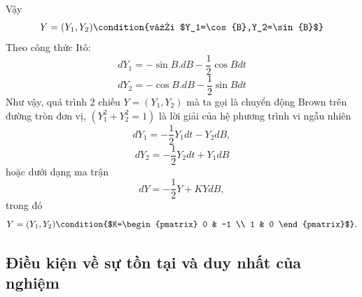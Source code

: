 \documentclass[14pt,a4paper]{article}
\numberwithin{equation}{section}
\begin{document}
Vậy
\begin{equation*}
	Y=(Y_1,Y_2) \condition{với $Y_1=\cos{B},Y_2=\sin{B}$}
\end{equation*}
Theo công thức Itô:
\begin{equation*}
	dY_1=-\sin{B.dB}-\dfrac{1}{2}\cos{B}dt
\end{equation*}
\begin{equation*}
	dY_2=-\cos{B.dB}-\dfrac{1}{2}\sin{B}dt
\end{equation*}
Như vậy, quá trình 2 chiều $Y=(Y_1,Y_2)$ mà ta gọi là chuyển động Brown trên đường tròn đơn vị, $(Y_1^2+Y_2^2=1)$ là lời giải của hệ phương trình vi ngẫu nhiên
\begin{equation*}
	dY_1=-\dfrac{1}{2}Y_1dt-Y_2dB,
\end{equation*}
\begin{equation*}
	dY_2=-\dfrac{1}{2}Y_2dt+Y_1dB
\end{equation*}
hoặc dưới dạng ma trận
\begin{equation*}
	dY=-\dfrac{1}{2}Y+KYdB,
\end{equation*} 
trong đó
\begin{equation*}
	Y=(Y_1,Y_2)\condition{$K=\begin{pmatrix} 0 & -1 \\ 1 & 0 \end{pmatrix}$}.
\end{equation*}
\subsection{Điều kiện về sự tồn tại và duy nhất của nghiệm}
\end{document}
